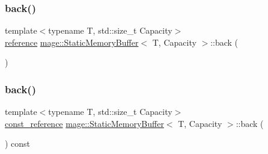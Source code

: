 \mbox{\label{classmage_1_1_static_memory_buffer_acd908ab5553b6313404f7c2b2de10563}} 
\subsubsection{\texorpdfstring{back()}{back()}\hspace{0.1cm}{\footnotesize\ttfamily [1/2]}}
{\footnotesize\ttfamily template$<$typename T, std\+::size\+\_\+t Capacity$>$ \\
\mbox{\hyperlink{classmage_1_1_static_memory_buffer_ac00b0718b8b57bcaee2a7904637fc031}{reference}} \mbox{\hyperlink{classmage_1_1_static_memory_buffer}{mage\+::\+Static\+Memory\+Buffer}}$<$ T, Capacity $>$\+::back (\begin{DoxyParamCaption}{ }\end{DoxyParamCaption})\hspace{0.3cm}{\ttfamily [noexcept]}}

\mbox{\label{classmage_1_1_static_memory_buffer_ac53cedcbc9f9396c8eb958b1188e48ac}} 
\subsubsection{\texorpdfstring{back()}{back()}\hspace{0.1cm}{\footnotesize\ttfamily [2/2]}}
{\footnotesize\ttfamily template$<$typename T, std\+::size\+\_\+t Capacity$>$ \\
\mbox{\hyperlink{classmage_1_1_static_memory_buffer_a2d961d7baf56ebc96e1e48579bcdcb84}{const\+\_\+reference}} \mbox{\hyperlink{classmage_1_1_static_memory_buffer}{mage\+::\+Static\+Memory\+Buffer}}$<$ T, Capacity $>$\+::back (\begin{DoxyParamCaption}{ }\end{DoxyParamCaption}) const\hspace{0.3cm}{\ttfamily [noexcept]}}

\mbox{\label{classmage_1_1_static_memory_buffer_aa40e217fad7fd0199a3df00fdd152193}} 

